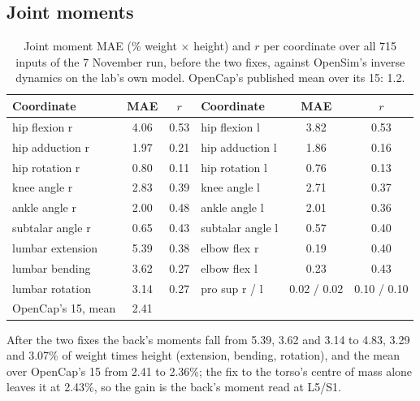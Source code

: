 \documentclass[11pt]{article}
\begin{document}
\subsection{Joint moments}
\begin{table}[h]
\centering\small
\caption{Joint moment MAE (\% weight $\times$ height) and $r$ per coordinate over all 715 inputs of the 7 November
run, before the two fixes, against OpenSim's inverse dynamics on the lab's own model. OpenCap's published mean over
its 15: 1.2.}
\begin{tabular}{@{}lcc@{\hspace{2em}}lcc@{}}
\toprule
Coordinate & MAE & $r$ & Coordinate & MAE & $r$ \\
\midrule
hip flexion r & 4.06 & 0.53 & hip flexion l & 3.82 & 0.53 \\
hip adduction r & 1.97 & 0.21 & hip adduction l & 1.86 & 0.16 \\
hip rotation r & 0.80 & 0.11 & hip rotation l & 0.76 & 0.13 \\
knee angle r & 2.83 & 0.39 & knee angle l & 2.71 & 0.37 \\
ankle angle r & 2.00 & 0.48 & ankle angle l & 2.01 & 0.36 \\
subtalar angle r & 0.65 & 0.43 & subtalar angle l & 0.57 & 0.40 \\
lumbar extension & 5.39 & 0.38 & elbow flex r & 0.19 & 0.40 \\
lumbar bending & 3.62 & 0.27 & elbow flex l & 0.23 & 0.43 \\
lumbar rotation & 3.14 & 0.27 & pro sup r / l & 0.02 / 0.02 & 0.10 / 0.10 \\
\midrule
OpenCap's 15, mean & 2.41 & & & & \\
\bottomrule
\end{tabular}
\end{table}
After the two fixes the back's moments fall from 5.39, 3.62 and 3.14 to 4.83, 3.29 and 3.07\% of weight times height
(extension, bending, rotation), and the mean over OpenCap's 15 from 2.41 to 2.36\%; the fix to the torso's centre of
mass alone leaves it at 2.43\%, so the gain is the back's moment read at L5/S1.
\end{document}
